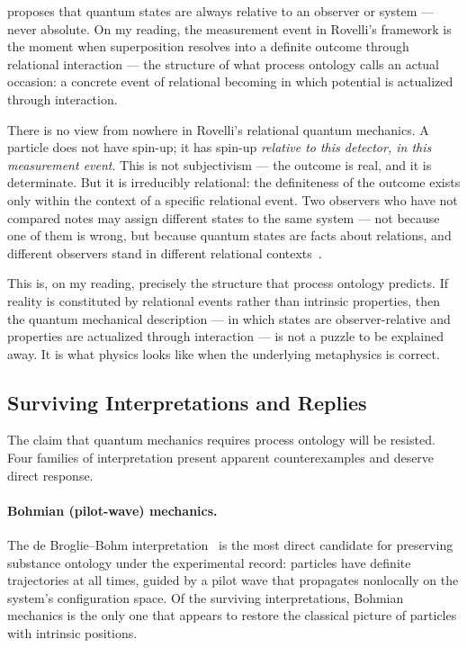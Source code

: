 \citet{Rovelli1996} proposes that quantum states are always relative to an
observer or system --- never absolute.
On my reading, the measurement event in Rovelli's framework is the moment
when superposition resolves into a definite outcome through relational
interaction --- the structure of what process ontology calls an actual
occasion: a concrete event of relational becoming in which potential is
actualized through interaction.

There is no view from nowhere in Rovelli's relational quantum mechanics.
A particle does not have spin-up; it has spin-up \emph{relative to this
detector, in this measurement event}.
This is not subjectivism --- the outcome is real, and it is determinate.
But it is irreducibly relational: the definiteness of the outcome exists
only within the context of a specific relational event.
Two observers who have not compared notes may assign different states to
the same system --- not because one of them is wrong, but because quantum
states are facts about relations, and different observers stand in
different relational contexts~\citep{Rovelli2021}.

This is, on my reading, precisely the structure that process ontology predicts.
If reality is constituted by relational events rather than intrinsic
properties, then the quantum mechanical description --- in which states
are observer-relative and properties are actualized through interaction ---
is not a puzzle to be explained away.
It is what physics looks like when the underlying metaphysics is correct.

\subsection{Surviving Interpretations and Replies}
\label{sec:objections}

The claim that quantum mechanics requires process ontology will be resisted.
Four families of interpretation present apparent counterexamples and
deserve direct response.

\paragraph{Bohmian (pilot-wave) mechanics.}
The de Broglie--Bohm interpretation~\citep{Bohm1980} is the most direct
candidate for preserving substance ontology under the experimental record:
particles have definite trajectories at all times, guided by a pilot wave
that propagates nonlocally on the system's configuration space.
Of the surviving interpretations, Bohmian mechanics is the only one that
appears to restore the classical picture of particles with intrinsic
positions.

